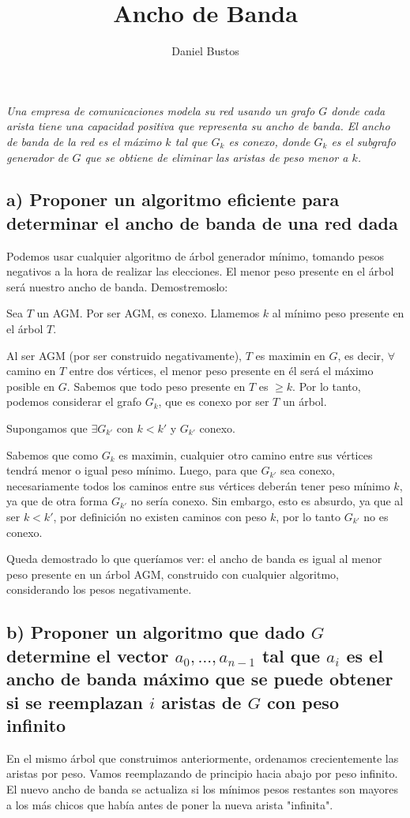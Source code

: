 \documentclass{article}
\title{Ancho de Banda}
\author{Daniel Bustos}
\begin{document}
\maketitle

\textit{Una empresa de comunicaciones modela su red usando un grafo \(G\) donde cada arista tiene una
capacidad positiva que representa su ancho de banda. El ancho de banda de la red es el máximo
\(k\) tal que \(G_k\) es conexo, donde \(G_k\) es el subgrafo generador de \(G\) que se obtiene de eliminar las
aristas de peso menor a \(k\).}

\subsection*{a) Proponer un algoritmo eficiente para determinar el ancho de banda de una red dada}

Podemos usar cualquier algoritmo de árbol generador mínimo, tomando pesos negativos a la hora de realizar las elecciones. El menor peso presente en el árbol será nuestro ancho de banda. Demostremoslo:

Sea \(T\) un AGM. Por ser AGM, es conexo. Llamemos \(k\) al mínimo peso presente en el árbol \(T\).

Al ser AGM (por ser construido negativamente), \(T\) es maximin en \(G\), es decir, \(\forall\) camino en \(T\) entre dos vértices, el menor peso presente en él será el máximo posible en \(G\). Sabemos que todo peso presente en \(T\) es \(\geq k\). Por lo tanto, podemos considerar el grafo \(G_k\), que es conexo por ser \(T\) un árbol.

Supongamos que \(\exists G_{k'}\) con \(k < k'\) y \(G_{k'}\) conexo.

Sabemos que como \(G_k\) es maximin, cualquier otro camino entre sus vértices tendrá menor o igual peso mínimo. Luego, para que \(G_{k'}\) sea conexo, necesariamente todos los caminos entre sus vértices deberán tener peso mínimo \(k\), ya que de otra forma \(G_{k'}\) no sería conexo. Sin embargo, esto es absurdo, ya que al ser \(k < k'\), por definición no existen caminos con peso \(k\), por lo tanto \(G_{k'}\) no es conexo.

Queda demostrado lo que queríamos ver: el ancho de banda es igual al menor peso presente en un árbol AGM, construido con cualquier algoritmo, considerando los pesos negativamente.

\subsection*{b) Proponer un algoritmo que dado \(G\) determine el vector \(a_0, \ldots, a_{n-1}\) tal que \(a_i\) es el ancho de banda máximo que se puede obtener si se reemplazan \(i\) aristas de \(G\) con peso infinito}

En el mismo árbol que construimos anteriormente, ordenamos crecientemente las aristas por peso. Vamos reemplazando de principio hacia abajo por peso infinito. El nuevo ancho de banda se actualiza si los mínimos pesos restantes son mayores a los más chicos que había antes de poner la nueva arista "infinita".
\end{document}
